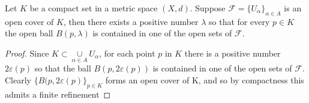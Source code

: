 \documentclass[12pt]{amsart}
\theoremstyle{remark}
\numberwithin{equation}{section} \numberwithin{thm}{section}
\numberwithin{rmk}{section} \numberwithin{figure}{section}
\begin{document}
\title{}



Let $K$ be a compact set in a metric space $(X,d)$. Suppose $\mathcal{F}=\{U_\alpha\}_{\alpha \in A}$ is an open cover of $K$, then there exists a positive number $\lambda$ so that for every $p \in K$ the open ball $B(p,\lambda)$ is contained in one of the open sets of $\mathcal{F}$.


\begin{proof}
Since $K \subset \underset{\alpha \in A}\cup U_\alpha$, for each point $p$ in $K$ there is a positive number $2\varepsilon(p)$ so that the ball $B(p,2\varepsilon(p))$ is contained in one of the open sets of $\mathcal{F}$. Clearly $\{B(p,2\varepsilon(p)\}_{p \in K}$ forms an open cover of K, and so by compactness this admits a finite refinement


\end{proof}
\end{document}
